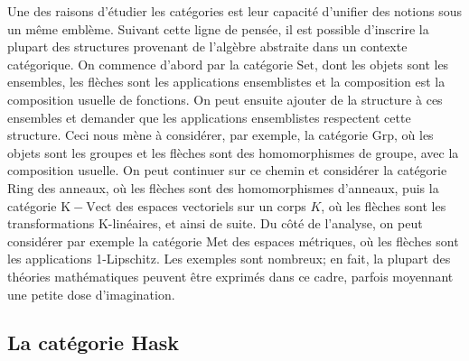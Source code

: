 Une des raisons d'étudier les catégories est leur capacité d'unifier des
notions sous un même emblème. Suivant cette ligne de pensée, il est possible
d'inscrire la plupart des structures provenant de l'algèbre abstraite dans
un contexte catégorique. On commence d'abord par la catégorie $\mathrm{Set}$,
dont les objets sont les ensembles, les flèches sont les applications
ensemblistes et la composition est la composition usuelle de fonctions.
On peut ensuite ajouter de la structure à ces ensembles et demander que
les applications ensemblistes respectent cette structure. Ceci nous mène
à considérer, par exemple, la catégorie $\mathrm{Grp}$, où les objets sont
les groupes et les flèches sont des homomorphismes de groupe, avec la
composition usuelle. On peut continuer sur ce chemin et considérer la
catégorie $\mathrm{Ring}$ des anneaux, où les flèches sont des homomorphismes
d'anneaux, puis la catégorie $\mathrm{K-Vect}$ des espaces vectoriels sur un
corps $K$, où les flèches sont les transformations K-linéaires, et ainsi de
suite. Du côté de l'analyse, on peut considérer par exemple la catégorie
$\mathrm{Met}$ des espaces métriques, où les flèches sont les applications
1-Lipschitz. Les exemples sont nombreux; en fait, la plupart des théories
mathématiques peuvent être exprimés dans ce cadre, parfois moyennant une
petite dose d'imagination.


\subsection{La catégorie Hask}

